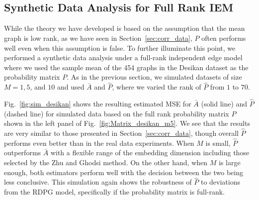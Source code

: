 \documentclass[10pt,letterpaper]{article}
\renewcommand{\hat}{\widehat}
\begin{document}
%
%


\subsection{Synthetic Data Analysis for Full Rank IEM}\label{sec:sim_iem}

While the theory we have developed is based on the assumption that the mean graph is low rank, as we have seen in Section~\ref{sec:corr_data}, $\hat{P}$ often performs well even when this assumption is false. 
To further illuminate this point, we performed a synthetic data analysis under a full-rank independent edge model where we used the sample mean of the 454 graphs in the Desikan dataset as the probability matrix $P$.
As in the previous section, we simulated datasets of size $M=1,5$, and $10$ and used $\bar{A}$ and $\hat{P}$, where we varied the rank of $\hat{P}$ from $1$ to $70$.

Fig.~\ref{fig:sim_desikan} shows the resulting estimated MSE for $\bar{A}$ (solid line) and $\hat{P}$ (dashed line) for simulated data based on the full rank probability matrix $P$ shown in the left panel of Fig.~\ref{fig:Matrix_desikan_m5}.
We see that the results are very similar to those presented in Section~\ref{sec:corr_data}, though overall $\hat{P}$ performs even better than in the real data experiments. 
When $M$ is small, $\hat{P}$ outperforms $\bar{A}$ with a flexible range of the embedding dimension including those selected by the Zhu and Ghodsi method.
On the other hand, when $M$ is large enough, both estimators perform well with the decision between the two being less conclusive.
This simulation again shows the robustness of $\hat{P}$ to deviations from the RDPG model, specifically if the probability matrix is full-rank.
\end{document}
